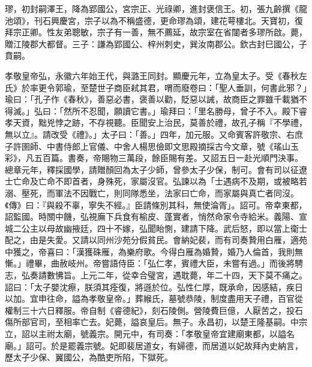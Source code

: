 \begin{pinyinscope}
 璆，初封嗣澤王，降為郢國公，宮宗正、光祿卿，進封褒信王。初，張九齡撰《龍池頌》，刊石興慶宮，宗子以為不稱盛德，更命璆為頌，建花萼樓北。天寶初，復拜宗正卿。性友弟聰敏，宗子有一善，無不薦延，故宗室在省闥者多璆所啟。薨，贈江陵郡大都督。三子：謙為郢國公、梓州刺史，巽汝南郡公。欽古封巳國公，子賁嗣。



 孝敬皇帝弘，永徽六年始王代，與潞王同封。顯慶元年，立為皇太子。受《春秋左氏》於率更令郭瑜，至楚世子商臣弒其君，喟而廢卷曰：「聖人垂訓，何書此邪？」瑜曰：「孔子作《春秋》，善惡必書，褒善以勸，貶惡以誡，故商臣之罪雖千載猶不得滅。」弘曰：「然所不忍聞，願讀它書。」瑜拜曰：「里名勝母，曾子不入。殿下睿孝天資，黜兇悖之跡，不存視聽。臣聞安上治民，莫善於禮，故孔子稱『不學禮，無以立』。請改受《禮》。」太子曰：「善。」四年，加元服。又命賓客許敬宗、右庶子許圉師、中書侍郎上官儀、中舍人楊思儉即文思殿摘採古今文章，號《瑤山玉彩》，凡五百篇。書奏，帝賜物三萬段，餘臣賜有差。又詔五日一赴光順門決事。總章元年，釋採國學，請贈顏回為太子少師，曾參太子少保，制可。會有司以征遼士亡命及亡命不即首者，身殊死，家屬沒官。弘諫以為「士遇病不及期，或被略若溺、壓死，而軍法不因戰亡，則同隊悉坐，法家曰亡命，而家屬與真亡者同沒。《傳》曰：『與殺不辜，寧失不經。』臣請條別其科，無使淪胥」。詔可。帝幸東都，詔監國。時關中饑，弘視廡下兵食有榆皮、蓬實者，悄然命家令寺給米。義陽、宣城二公主以母故幽掖廷，四十不嫁，弘聞眙惻，建請下降。武后怒，即以當上衛士配之，由是失愛。又請以同州沙苑分假貧民。會納妃裴，而有司奏贄用白雁，適苑中獲之，帝喜曰：「漢獲硃雁，為樂府歌。今得白雁為婚贄，婚乃人倫首，我則無慚。」禮畢，曲赦岐州。帝嘗語侍臣：「弘仁孝，賓禮大臣，未嘗有過。」而後將騁志，弘奏請數怫旨。上元二年，從幸合璧宮，遇耽薨，年二十四，天下莫不痛之。詔曰：「太子嬰沈瘵，朕須其痊復，將遜於位。弘性仁厚，既承命，因感結，疾日以加。宜申往命，謚為孝敬皇帝。」葬緱氏，墓號恭陵，制度盡用天子禮，百官從權制三十六日釋服。帝自制《睿德紀》，刻石陵側。營陵費巨億，人厭苦之，投石傷所部官司，至相率亡去。妃薨，謚哀皇后。無子。永昌初，以楚王隆基嗣。中宗立，詔以主祔太廟，號義宗。開元中，有司奏：「孝敬皇帝宜建廟東都，以謚名廟。」詔可。於是罷義宗號。妃即裴居道女，有婦德，而居道以妃故拜內史納言，歷太子少保、翼國公，為酷吏所陷，下獄死。




\end{pinyinscope}
